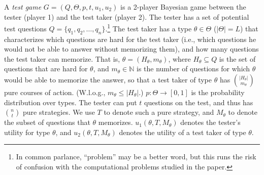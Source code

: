 \documentclass{article}
\begin{document}
A \emph{test game} $G = (Q, \Theta, p, t, u_1, u_2)$ is a 2-player
Bayesian game
between the tester (player 1) and the test taker (player 2). 
The tester has a set of potential test
questions $Q = \{q_1, q_2, \ldots, q_n\}$.\footnote{In common parlance,
  ``problem'' may be a better word, but this runs the risk of confusion
  with the computational problems studied in the paper.}
  The test taker has a type
$\theta \in \Theta$ ($|\Theta| = L$) that characterizes which questions
are hard for the test taker
 (i.e., which questions he would
not be able to answer without memorizing them), and how many questions the test
taker can memorize.  That is, $\theta = (H_\theta, m_\theta)$, where
$H_\theta \subseteq Q$ is the set of questions that are hard for $\theta$,
and $m_\theta \in \mathbb N$ is the number of questions for which $\theta$
would be able to memorize the answer, so that a test taker of type $\theta$
has $|H_\theta| \choose m_\theta$ pure courses of action.
(W.l.o.g., $m_\theta \leq |H_\theta|$.)
$p: \Theta \rightarrow [0,1]$ is the
probability distribution over types.
The tester can put $t$ questions on the test, and thus has $n \choose t$
pure strategies.  We use $T$ to denote such a pure strategy, and $M_\theta$
to denote the subset of questions that $\theta$ memorizes.  $u_1(\theta, T,
M_\theta)$ denotes the tester's utility for type $\theta$, and $u_2(\theta,
T, M_\theta)$ denotes the utility of a test taker of type $\theta$.
\end{document}
